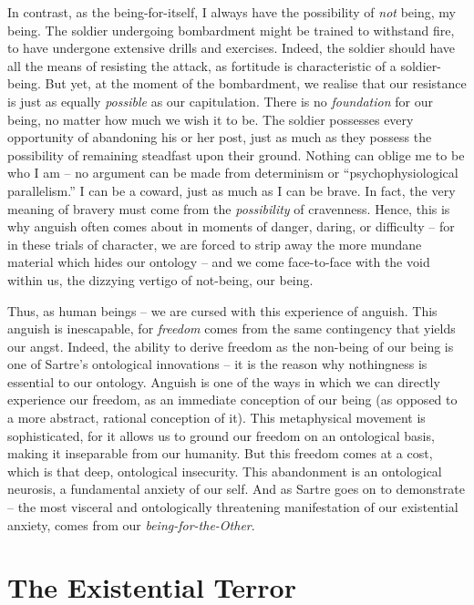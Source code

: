 In contrast, as the being-for-itself, I always have the possibility of \emph{not} being, my being. The soldier undergoing bombardment might be trained to withstand fire, to have undergone extensive drills and exercises. Indeed, the soldier should have all the means of resisting the attack, as fortitude is characteristic of a soldier-being. But yet, at the moment of the bombardment, we realise that our resistance is just as equally \emph{possible} as our capitulation. There is no \emph{foundation} for our being, no matter how much we wish it to be. The soldier possesses every opportunity of abandoning his or her post, just as much as they possess the possibility of remaining steadfast upon their ground.  Nothing can oblige me to be who I am -- no argument can be made from determinism or \enquote{psychophysiological parallelism.} I can be a coward, just as much as I can be brave. In fact, the very meaning of bravery must come from the \emph{possibility} of cravenness. Hence, this is why anguish often comes about in moments of danger, daring, or difficulty -- for in these trials of character, we are forced to strip away the more mundane material which hides our ontology -- and we come face-to-face with the void within us, the dizzying vertigo of not-being, our being.

Thus, as human beings -- we are cursed with this experience of anguish. This anguish is inescapable, for \emph{freedom} comes from the same contingency that yields our angst. Indeed, the ability to derive freedom as the non-being of our being is one of Sartre's ontological innovations -- it is the reason why nothingness is essential to our ontology. Anguish is one of the ways in which we can directly experience our freedom, as an immediate conception of our being (as opposed to a more abstract, rational conception of it).  This metaphysical movement is sophisticated, for it allows us to ground our freedom on an ontological basis, making it inseparable from our humanity.  But this freedom comes at a cost, which is that deep, ontological insecurity.  This abandonment is an ontological neurosis, a fundamental anxiety of our self. And as Sartre goes on to demonstrate -- the most visceral and ontologically threatening manifestation of our existential anxiety, comes from our \emph{being-for-the-Other}.


\section{The Existential Terror}

